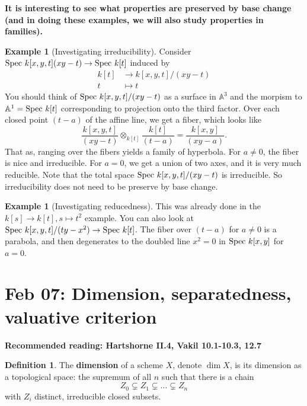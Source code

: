 \documentclass[10pt,reqno]{amsart}
\theoremstyle{definition}
\newtheorem{example}[theorem]{Example}
\newtheorem{definition}[theorem]{Definition}
\theoremstyle{remark}
\numberwithin{equation}{section}
\numberwithin{theorem}{section}
\newcommand{\spec}{\textup{Spec }}
\newcommand{\A}{{\mathbb A}}
\begin{document}
\textbf{It is interesting to see what properties are preserved by base change (and in doing these examples, we will also study properties in families).}

\begin{example}[Investigating irreducibility] Consider $\spec k[x,y,t](xy-t) \to \spec k[t]$ induced by
\begin{align*}
k[t] &\to k[x,y,t]/(xy-t)\\
t &\mapsto t
\end{align*}
You should think of $\spec k[x,y,t]/(xy-t)$ as a surface in $\A^3$ and the morpism to $\A^1 = \spec k[t]$ corresponding to projection onto the third factor. Over each closed point $(t-a)$ of the affine line, we get a fiber, which looks like
\[\frac{k[x,y,t]}{(xy-t)} \otimes_{k[t]} \frac{k[t]}{(t-a)} = \frac{k[x,y]}{(xy-a)}.\]
That as, ranging over the fibers yields a family of hyperbola. For $a \ne 0$, the fiber is nice and irreducible. For $a=0$, we get a union of two axes, and it is very much reducible. Note that the total space $\spec k[x,y,t]/(xy-t)$ is irreducible. So irreducibility does not need to be preserve by base change.
\end{example}

\begin{example}[Investigating reducedness] This was already done in the $k[s] \to k[t], s \mapsto t^2$ example. You can also look at $\spec k[x,y,t]/(ty-x^2) \to \spec k[t]$. The fiber over $(t-a)$ for $a \ne 0$ is a parabola, and then degenerates to the doubled line $x^2 = 0$ in $\spec k[x,y]$ for $a=0$.
\end{example}
\section{Feb 07: Dimension, separatedness, valuative criterion}
\textbf{Recommended reading: Hartshorne II.4, Vakil 10.1-10.3, 12.7}

\begin{definition} The \textbf{dimension} of a scheme $X$, denote $\dim X$, is its dimension as a topological space: the supremum of all $n$ such that there is a chain
\[Z_0 \subsetneq Z_1 \subsetneq \dots \subsetneq Z_n\]
with $Z_i$ distinct, irreducible closed subsets.
\end{definition}
\end{document}
